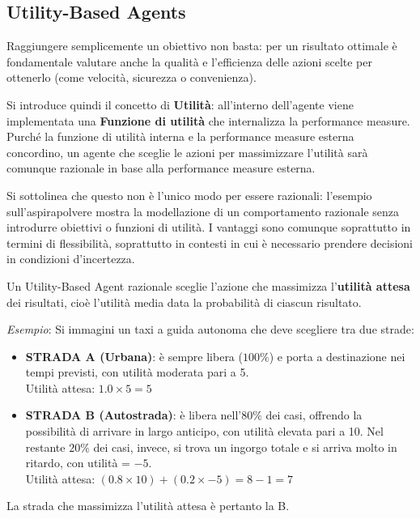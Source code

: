 \documentclass[a4paper, 11pt, oneside]{book}
\theoremstyle{definition}
\begin{document}
	\subsection{Utility-Based Agents}
	Raggiungere semplicemente un obiettivo non basta: per un risultato ottimale \`e
	fondamentale valutare anche la qualit\`a e l'efficienza delle azioni scelte per
	ottenerlo (come velocit\`a, sicurezza o convenienza).

	Si introduce quindi il concetto di \textbf{Utilit\`a}: all'interno
	dell'agente viene implementata una \textbf{Funzione di utilit\`a} che internalizza
	la performance measure. Purch\'e la funzione di utilit\`a interna e la performance
	measure esterna concordino, un agente che sceglie le azioni per massimizzare
	l'utilit\`a sar\`a comunque razionale in base alla performance measure esterna.

	Si sottolinea che questo non \`e l'unico modo per essere razionali: l'esempio
	sull'aspirapolvere mostra la modellazione di un comportamento razionale senza
	introdurre obiettivi o funzioni di utilit\`a. I vantaggi sono comunque soprattutto in
	termini di flessibilit\`a, soprattutto in contesti in cui \`e
	necessario prendere decisioni in condizioni d'incertezza.

	Un Utility-Based Agent razionale sceglie l'azione che massimizza l'\textbf{utilit\`a
	attesa} dei risultati, cio\`e l'utilit\`a media data la probabilit\`a di ciascun
	risultato.

	\emph{Esempio}: Si immagini un taxi a guida autonoma che deve scegliere tra
	due strade:
	\begin{itemize}
		\item \textbf{STRADA A (Urbana)}: \`e sempre libera ($100\%$) e porta a
			destinazione nei tempi previsti, con utilit\`a moderata pari a 5. \\Utilit\`a
			attesa: $1.0 \times 5 = 5$

		\item \textbf{STRADA B (Autostrada)}: \`e libera nell'$80\%$ dei casi, offrendo
			la possibilit\`a di arrivare in largo anticipo, con utilit\`a elevata pari
			a 10. Nel restante $20\%$ dei casi, invece, si trova un ingorgo totale e
			si arriva molto in ritardo, con utilit\`a = $-5$. \\Utilit\`a attesa:
			$(0.8 \times 10) + (0.2 \times -5) = 8 - 1 = 7$
	\end{itemize}

	La strada che massimizza l'utilit\`a attesa \`e pertanto la B.
\end{document}

